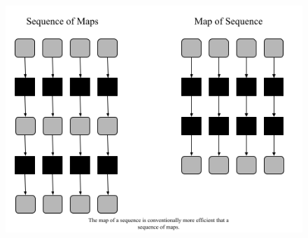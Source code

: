 \documentclass{article}
\begin{document}
\begin{figure}[H]
    \centering
    \includegraphics[width=0.75\linewidth]{Sequence of Maps Versus Map of Sequence.png}
\end{figure}


    
\end{document}

